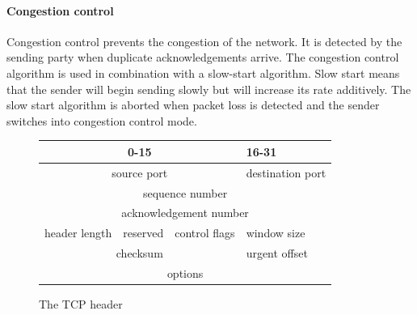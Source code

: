 \documentclass[11pt,twoside,abstract,notitlepage]{scrreprt}
\begin{document}
\paragraph{Congestion control}
Congestion control prevents the congestion of the network. It is detected by the sending party when duplicate acknowledgements arrive. The congestion control algorithm is used in combination with a slow-start algorithm. Slow start means that the sender will begin sending slowly but will increase its rate additively. The slow start algorithm is aborted when packet loss is detected and the sender switches into congestion control mode. 


\begin{figure}
\small
\renewcommand{\arraystretch}{1.2}
\caption{The TCP header}
\label{tcpheader}
\centering
\begin{tabularx}{\textwidth}{|X|X|X|X|}
\hline
\multicolumn{3}{|c|}{0-15} & 16-31 \\ \hline
\multicolumn{3}{|c|}{source port} & destination port \\ \hline
\multicolumn{4}{|c|}{sequence number} \\ \hline
\multicolumn{4}{|c|}{acknowledgement number} \\ \hline
header length & reserved & control flags & window size \\ \hline
\multicolumn{3}{|c|}{checksum} & urgent offset \\ \hline
\multicolumn{4}{|c|}{options} \\ \hline
\end{tabularx}
\end{figure}
\end{document}
